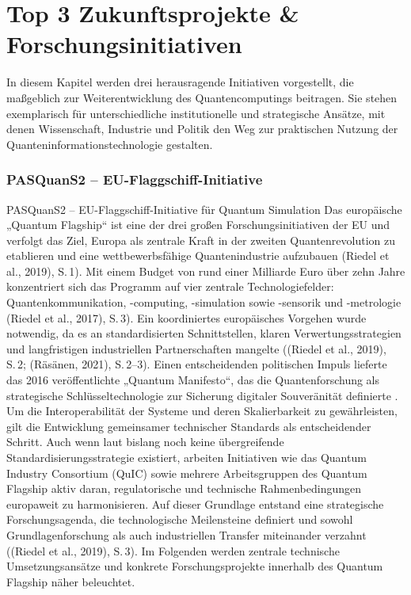 \section{Top 3 Zukunftsprojekte \& Forschungsinitiativen}

In diesem Kapitel werden drei herausragende Initiativen vorgestellt, die maßgeblich zur Weiterentwicklung des Quantencomputings beitragen. Sie stehen exemplarisch für unterschiedliche institutionelle und strategische Ansätze, mit denen Wissenschaft, Industrie und Politik den Weg zur praktischen Nutzung der Quanteninformationstechnologie gestalten. 

\subsubsection*{PASQuanS2 – EU-Flaggschiff-Initiative}

PASQuanS2 – EU-Flaggschiff-Initiative für Quantum Simulation
Das europäische „Quantum Flagship“ ist eine der drei großen Forschungsinitiativen der EU und verfolgt das Ziel, Europa als zentrale Kraft in der zweiten Quantenrevolution zu etablieren und eine wettbewerbsfähige Quantenindustrie aufzubauen \citealp[1]{r} \cite{}(Riedel et al., 2019), S. 1). Mit einem Budget von rund einer Milliarde Euro über zehn Jahre konzentriert sich das Programm auf vier zentrale Technologiefelder: Quantenkommunikation, -computing, -simulation sowie -sensorik und -metrologie \cite{}(Riedel et al., 2017), S. 3).
Ein koordiniertes europäisches Vorgehen wurde notwendig, da es an standardisierten Schnittstellen, klaren Verwertungsstrategien und langfristigen industriellen Partnerschaften mangelte \cite{}((Riedel et al., 2019), S. 2; \citealp[2ff.]{}(Räsänen, 2021), S. 2–3). Einen entscheidenden politischen Impuls lieferte das 2016 veröffentlichte „Quantum Manifesto“, das die Quantenforschung als strategische Schlüsseltechnologie zur Sicherung digitaler Souveränität definierte \citealp[1]{vandeventerEuropeanStandardsQuantum2022}. Um die Interoperabilität der Systeme und deren Skalierbarkeit zu gewährleisten, gilt die Entwicklung gemeinsamer technischer Standards als entscheidender Schritt. Auch wenn laut \citealp[2ff.]{vandeventerEuropeanStandardsQuantum2022} bislang noch keine übergreifende Standardisierungsstrategie existiert, arbeiten Initiativen wie das Quantum Industry Consortium (QuIC) sowie mehrere Arbeitsgruppen des Quantum Flagship aktiv daran, regulatorische und technische Rahmenbedingungen europaweit zu harmonisieren. Auf dieser Grundlage entstand eine strategische Forschungsagenda, die technologische Meilensteine definiert und sowohl Grundlagenforschung als auch industriellen Transfer miteinander verzahnt \cite{}((Riedel et al., 2019), S. 3). Im Folgenden werden zentrale technische Umsetzungsansätze und konkrete Forschungsprojekte innerhalb des Quantum Flagship näher beleuchtet.

